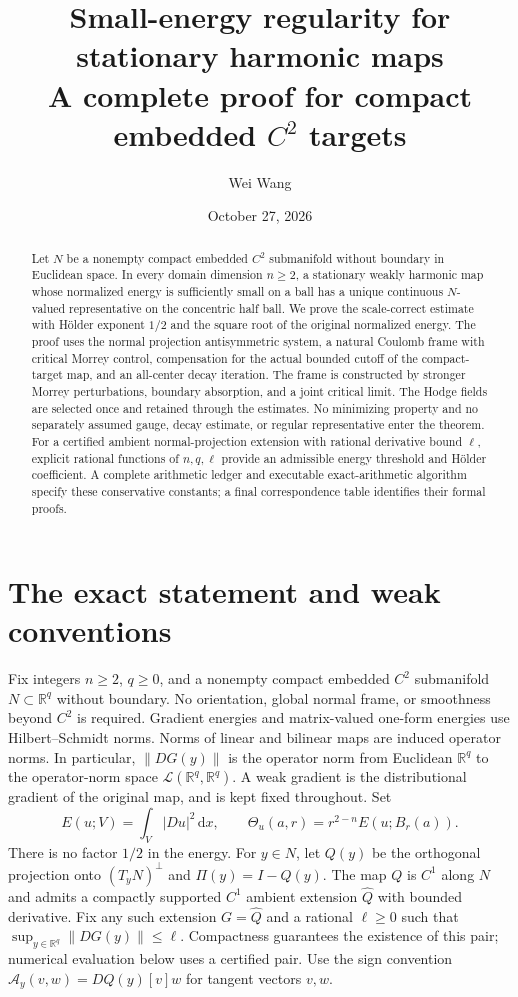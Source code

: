 \documentclass[reqno,11pt]{amsart}
\title[Stationary harmonic maps in Lean]{Small-energy regularity for stationary harmonic maps\texorpdfstring{\\}{} A complete proof for compact embedded $C^2$ targets}
\author{Wei Wang}
\date{October 27, 2026}
\numberwithin{equation}{section}
\theoremstyle{definition}
\theoremstyle{remark}
\newcommand{\R}{\mathbb R}
\newcommand{\dd}{\,\mathrm d}
\newcommand{\dx}{\dd x}
\newcommand{\Th}{\Theta}
\newcommand{\norm}[1]{\left\lVert#1\right\rVert}
\begin{document}
\begin{abstract}
Let $N$ be a nonempty compact embedded $C^2$ submanifold without boundary
in Euclidean space. In every domain dimension $n\geq2$, a stationary weakly
harmonic map whose normalized energy is sufficiently small on a ball has a
unique continuous $N$-valued representative on the concentric half ball.
We prove the scale-correct estimate with H\"older exponent $1/2$ and the
square root of the original normalized energy. The proof uses the normal
projection antisymmetric system, a natural Coulomb frame with critical
Morrey control, compensation for the actual bounded cutoff of the
compact-target map, and an all-center decay iteration. The frame is
constructed by stronger Morrey perturbations, boundary absorption, and a
joint critical limit. The Hodge fields are selected once and retained
through the estimates. No minimizing property and no separately assumed
gauge, decay estimate, or regular representative enter the theorem.
For a certified ambient normal-projection extension with rational derivative
bound $\ell$, explicit rational functions of $n,q,\ell$ provide an
admissible energy threshold and H\"older coefficient. A complete arithmetic
ledger and executable exact-arithmetic algorithm specify these conservative
constants; a final correspondence table identifies their formal proofs.
\end{abstract}
\maketitle

\tableofcontents

\section{The exact statement and weak conventions}\label{sec:statement}
Fix integers $n\geq2$, $q\geq0$, and a nonempty compact embedded $C^2$
submanifold $N\subset\R^q$ without boundary. No orientation, global normal
frame, or smoothness beyond $C^2$ is required. Gradient energies and matrix-valued one-form energies use Hilbert--Schmidt
norms. Norms of linear and bilinear maps are induced operator norms.
In particular, $\norm{DG(y)}$ is the operator norm from Euclidean
$\R^q$ to the operator-norm space $\mathcal L(\R^q,\R^q)$. A weak gradient is the distributional
gradient of the original map, and is kept fixed throughout. Set
\[
 E(u;V)=\int_V|Du|^2\dx,\qquad
 \Th_u(a,r)=r^{2-n}E(u;B_r(a)).
\]
There is no factor $1/2$ in the energy.
For $y\in N$, let $Q(y)$ be the orthogonal projection onto $(T_yN)^\perp$
and $\Pi(y)=I-Q(y)$. The map $Q$ is $C^1$ along $N$ and admits a compactly
supported $C^1$ ambient extension $\widehat Q$ with bounded derivative.
Fix any such extension $G=\widehat Q$ and a rational $\ell\geq0$ such that
$\sup_{y\in\R^q}\norm{DG(y)}\leq\ell$. Compactness guarantees the
existence of this pair; numerical evaluation below uses a certified pair.
Use the sign convention
$\mathcal A_y(v,w)=DQ(y)[v]w$ for tangent vectors $v,w$.
\end{document}
